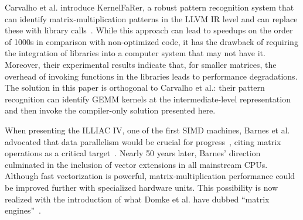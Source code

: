 \documentclass[\main/thesis.tex]{subfiles}
\begin{document}
Carvalho et al. introduce KernelFaRer, a robust pattern recognition system that can identify matrix-multiplication patterns in the LLVM IR level and can replace these with library calls~\cite{CarvalhoTACO21}. While this approach can lead to speedups on the order of 1000s in comparison with non-optimized code, it has the drawback of requiring the integration of libraries into a computer system that may not have it.
Moreover, their experimental results indicate that, for smaller matrices, the overhead of invoking functions in the libraries leads to performance degradations.
The solution in this paper is orthogonal to Carvalho et al.: their pattern recognition can identify GEMM kernels at the intermediate-level representation and then invoke the compiler-only solution presented here.


\begin{comment}
Nevertheless, the numbers are pointing that tiling, packing and unroll and jam of \kc loop are all required to reach peak performance.
To bridge the gap to 9\%, a proper vectorization schedule (without spills, data load before every \code{nr} fused multiply-add operations) needs to be generated in place of the default LLVM choice.
While the implementation relies on MLIR for cache optimization, the choice for code generation is flexible.
In fact, the work presents surprising results that substituting LLVM codegen with the best tile parameters is not different from using the $6 \times 8$ micro kernel from BLIS~\cite{blis2015}.
\end{comment}


When presenting the ILLIAC IV, one of the first SIMD machines, Barnes et al. advocated that data parallelism would be crucial for progress~\cite{1968barnes}, citing matrix operations as a critical target~\cite{1968kuck}.
Nearly 50 years later, Barnes' direction culminated in the inclusion of vector extensions in all mainstream CPUs.
Although fast vectorization is powerful, matrix-multiplication performance could be improved further with specialized hardware units.
This possibility is now realized with the introduction of what Domke et al. have dubbed ``matrix engines''~\cite{DomkeIPDPS21}.
\end{document}
